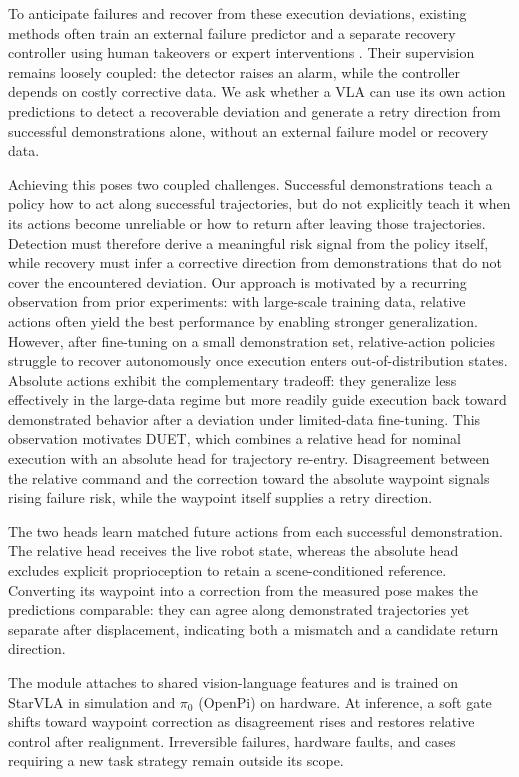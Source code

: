 \documentclass[letterpaper, 10 pt, conference]{ieeeconf}
\begin{document}
To anticipate failures and recover from these execution deviations, existing methods often train an external failure predictor \cite{faildetect} and a separate recovery controller using human takeovers or expert interventions \cite{dagger,sirius,intervengen}. Their supervision remains loosely coupled: the detector raises an alarm, while the controller depends on costly corrective data. We ask whether a VLA can use its own action predictions to detect a recoverable deviation and generate a retry direction from successful demonstrations alone, without an external failure model or recovery data.

Achieving this poses two coupled challenges. Successful demonstrations teach a policy how to act along successful trajectories, but do not explicitly teach it when its actions become unreliable or how to return after leaving those trajectories. Detection must therefore derive a meaningful risk signal from the policy itself, while recovery must infer a corrective direction from demonstrations that do not cover the encountered deviation. Our approach is motivated by a recurring observation from prior experiments: with large-scale training data, relative actions often yield the best performance by enabling stronger generalization. However, after fine-tuning on a small demonstration set, relative-action policies struggle to recover autonomously once execution enters out-of-distribution states. Absolute actions exhibit the complementary tradeoff: they generalize less effectively in the large-data regime but more readily guide execution back toward demonstrated behavior after a deviation under limited-data fine-tuning. This observation motivates DUET, which combines a relative head for nominal execution with an absolute head for trajectory re-entry. Disagreement between the relative command and the correction toward the absolute waypoint signals rising failure risk, while the waypoint itself supplies a retry direction.

The two heads learn matched future actions from each successful demonstration. The relative head receives the live robot state, whereas the absolute head excludes explicit proprioception to retain a scene-conditioned reference. Converting its waypoint into a correction from the measured pose makes the predictions comparable: they can agree along demonstrated trajectories yet separate after displacement, indicating both a mismatch and a candidate return direction.

The module attaches to shared vision-language features and is trained on StarVLA \cite{starvla} in simulation and $\pi_0$ (OpenPi) \cite{pi0} on hardware. At inference, a soft gate shifts toward waypoint correction as disagreement rises and restores relative control after realignment. Irreversible failures, hardware faults, and cases requiring a new task strategy remain outside its scope.
\end{document}
